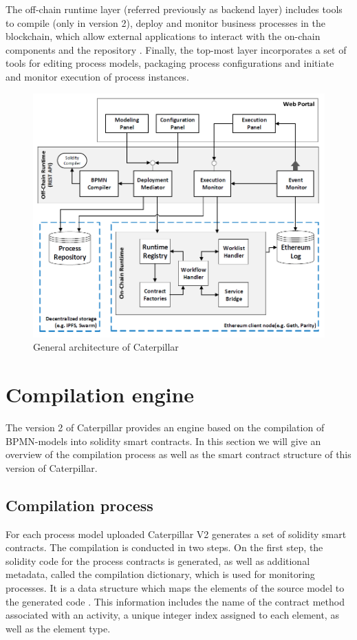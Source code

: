 The off-chain runtime layer (referred previously as backend layer) includes tools to compile (only in version 2), deploy and monitor business processes in the blockchain, which allow external applications to interact with the on-chain components and the repository \cite{caterpillar}. Finally, the top-most layer incorporates a set of tools for editing process models, packaging process configurations and initiate and monitor execution of process instances.

\begin{figure}[hbt]
	\includegraphics[width=\textwidth]{gfx/caterpillar-architecture}
	\caption{General architecture of Caterpillar}
	\label{fig:caterpillar:overview:architecture}
\end{figure}

\section{Compilation engine}
\label{sec:caterpillar:v2}

The version 2 of Caterpillar provides an engine based on the compilation of BPMN-models into solidity smart contracts. In this section we will give an overview of the compilation process as well as the smart contract structure of this version of Caterpillar.

\subsection{Compilation process}
\label{sec:caterpillar:v2:compilation}
For each process model uploaded Caterpillar V2 generates a set of solidity smart contracts. The compilation is conducted in two steps. On the first step, the solidity code for the process contracts is generated, as well as additional metadata, called the compilation dictionary, which is used for monitoring processes. It is a data structure which maps the elements of the source model to the generated code \cite{caterpillar}. This information includes the name of the contract method associated with an activity, a unique integer index assigned to each element, as well as the element type.

